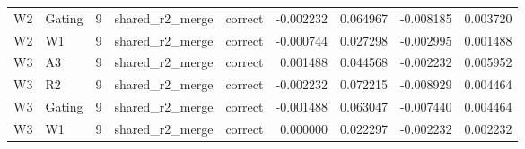 \begin{tabular}{llrllrrrr}
W2 & Gating & 9 & shared_r2_merge & correct & -0.002232 & 0.064967 & -0.008185 & 0.003720 \\
W2 & W1 & 9 & shared_r2_merge & correct & -0.000744 & 0.027298 & -0.002995 & 0.001488 \\
W3 & A3 & 9 & shared_r2_merge & correct & 0.001488 & 0.044568 & -0.002232 & 0.005952 \\
W3 & R2 & 9 & shared_r2_merge & correct & -0.002232 & 0.072215 & -0.008929 & 0.004464 \\
W3 & Gating & 9 & shared_r2_merge & correct & -0.001488 & 0.063047 & -0.007440 & 0.004464 \\
W3 & W1 & 9 & shared_r2_merge & correct & 0.000000 & 0.022297 & -0.002232 & 0.002232 \\
\bottomrule
\end{tabular}
